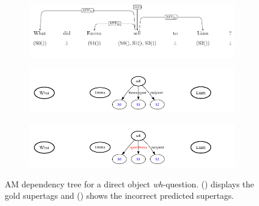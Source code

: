 \begin{figure}[ht] 
    \centering

    \begin{subfigure}[t]{0.99\textwidth}
        \centering
        \raisebox{4\totalheight}{\phantom{(abc)}}
        \includegraphics[scale=0.97]{figures/dobj_Q_deptree.pdf}
        \vspace{-1cm}
    \end{subfigure}
    \setcounter{subfigure}{0}  %
    \begin{subfigure}[t]{0.99\textwidth}
        \centering
        \vspace{-1.5cm}
        \label{fig:dobj_Q_gold} 
        \includegraphics[scale=1.2]{figures/dobj_Q_gold_supertags.pdf}
    \end{subfigure}
    \begin{subfigure}[t]{0.99\textwidth}
        \centering
        \vspace{-0.5cm}
        \label{fig:dobj_Q_error} 
        \includegraphics[scale=1.2]{figures/dobj_Q_error_supertags.pdf}
    \end{subfigure}
    \caption{AM dependency tree for a direct object \textit{wh}-question. ()  displays the gold supertags and () shows the incorrect predicted supertags. }
    \label{fig:dobj_deptree}
\end{figure}


